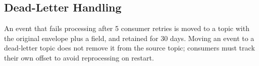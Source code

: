 \subsection{Dead-Letter Handling}
An event that fails processing after 5 consumer retries is moved to a
 topic with the original envelope plus a  field, and
retained for 30 days. Moving an event to a dead-letter topic does not remove it from the
source topic; consumers must track their own offset to avoid reprocessing on restart.
